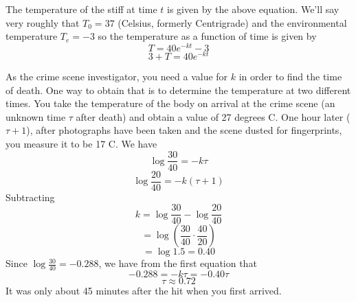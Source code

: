 \documentclass[11pt, oneside]{article}
\begin{document}
The temperature of the stiff at time $t$ is given by the above equation.  We'll say very roughly that $T_0 = 37$ (Celsius, formerly Centrigrade) and the environmental temperature $T_e = -3$ so the temperature as a function of time is given by
\[ T = 40 e^{-kt} - 3 \]
\[ 3 + T = 40 e^{-kt} \]

As the crime scene investigator, you need a value for $k$ in order to find the time of death.  One way to obtain that is to determine the temperature at two different times.  You take the temperature of the body on arrival at the crime scene (an unknown time $\tau$ after death) and obtain a value of 27 degrees C.  One hour later ($\tau + 1$), after photographs have been taken and the scene dusted for fingerprints, you measure it to be 17 C.  We have
\[ \log \frac{30}{40} = -k \tau \]
\[ \log \frac{20}{40} = -k(\tau + 1) \]
Subtracting
\[ k = \log \frac{30}{40} -  \log \frac{20}{40}  \]
\[ = \log (\frac{30}{40} \cdot \frac{40}{20}) \]
\[ = \log 1.5 = 0.40 \]
Since $\log \frac{30}{40} = -0.288$, we have from the first equation that
\[ -0.288 = -k \tau = -0.40 \tau \]
\[ \tau \approx 0.72 \]
It was only about 45 minutes after the hit when you first arrived.
\end{document}
